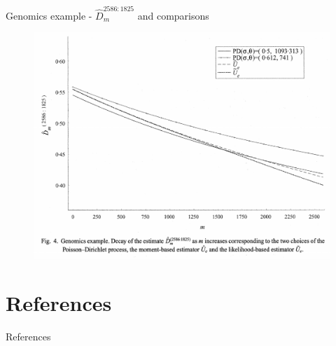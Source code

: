 \documentclass[11pt]{beamer}
\begin{document}
\begin{frame}{Genomics example - \(\hat{D}_m^{2586:1825}\) and comparisons}
    \begin{figure}
        \includegraphics[scale=0.35]{lijoi07_genomics_plot.png}
        \label{fig:genomics_2}
    \end{figure}
\end{frame}


\section{References}
\begin{frame}{References}
    \scriptsize{}
    
\end{frame}
 
\end{document}
